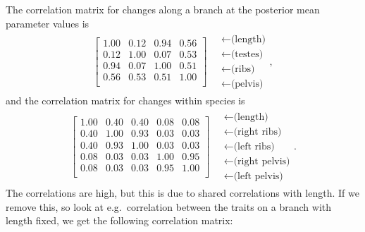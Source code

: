 \documentclass{article}
\begin{document}
The correlation matrix for changes along a branch at the posterior mean parameter values is \\
\begin{align}
\begin{bmatrix}
   1.00 & 0.12 & 0.94 & 0.56 \\ 
   0.12 & 1.00 & 0.07 & 0.53 \\ 
   0.94 & 0.07 & 1.00 & 0.51 \\ 
   0.56 & 0.53 & 0.51 & 1.00 \\ 
 \end{bmatrix}
\quad \begin{matrix}
  \leftarrow \text{(length)} \\
  \leftarrow \text{(testes)} \\
  \leftarrow \text{(ribs)} \\
  \leftarrow \text{(pelvis)} 
\end{matrix} ,
\end{align}
and the correlation matrix for changes within species is
\begin{align}
\begin{bmatrix}
   1.00 & 0.40 & 0.40 & 0.08 & 0.08 \\ 
   0.40 & 1.00 & 0.93 & 0.03 & 0.03 \\ 
   0.40 & 0.93 & 1.00 & 0.03 & 0.03 \\ 
   0.08 & 0.03 & 0.03 & 1.00 & 0.95 \\ 
   0.08 & 0.03 & 0.03 & 0.95 & 1.00 \\ 
 \end{bmatrix}
\quad \begin{matrix}
  \leftarrow \text{(length)} \\
  \leftarrow \text{(right ribs)} \\
  \leftarrow \text{(left ribs)} \\
  \leftarrow \text{(right pelvis)} \\
  \leftarrow \text{(left pelvis)} 
\end{matrix}  .
\end{align}
The correlations are high, but this is due to shared correlations with length.
If we remove this, so look at e.g.\ correlation between the traits on a branch with length fixed,
we get the following correlation matrix:
\end{document}
